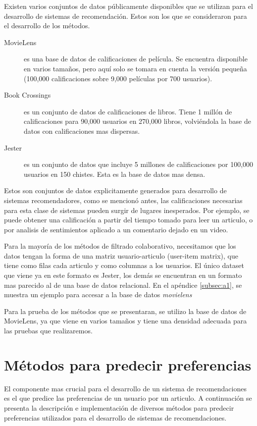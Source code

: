\documentclass[11pt]{article}
\begin{document}
Existen varios conjuntos de datos públicamente disponibles que se utilizan para
el desarrollo de sistemas de recomendación. Estos son los que se consideraron
para el desarrollo de los métodos.

\begin{description}
\item [MovieLens \cite{movielens}] es una base de datos de calificaciones de
  película. Se encuentra disponible en varios tamaños, pero aquí solo se tomara
  en cuenta la versión pequeña (100,000 calificaciones sobre 9,000 películas por
  700 usuarios).
\item [Book Crossings \cite{bookcrossing}] es un conjunto de datos de
  calificaciones de libros. Tiene 1 millón de calificaciones para 90,000
  usuarios en 270,000 libros, volviéndola la base de datos con calificaciones
  mas dispersas.
\item [Jester \cite{eigentaste}] es un conjunto de datos que incluye 5 millones
  de calificaciones por 100,000 usuarios en 150 chistes. Esta es la base de
  datos mas densa.
\end{description}

Estos son conjuntos de datos explicitamente generados para desarrollo de
sistemas recomendadores, como se mencionó antes, las calificaciones necesarias
para esta clase de sistemas pueden surgir de lugares inesperados. Por ejemplo,
se puede obtener una calificación a partir del tiempo tomado para leer un
articulo, o por analisis de sentimientos aplicado a un comentario dejado en un
video.

Para la mayoría de los métodos de filtrado colaborativo, necesitamos que los
datos tengan la forma de una matriz usuario-articulo (user-item matrix), que
tiene como filas cada articulo y como columnas a los usuarios. El único dataset
que viene ya en este formato es Jester, los demás se encuentran en un formato
mas parecido al de una base de datos relacional. En el apéndice \ref{subsec:a1},
se muestra un ejemplo para accesar a la base de datos \emph{movielens}

Para la prueba de los métodos que se presentaran, se utilizo la base de datos de
MovieLens, ya que viene en varios tamaños y tiene una densidad adecuada para las
pruebas que realizaremos.

\section{Métodos para predecir preferencias}

El componente mas crucial para el desarrollo de un sistema de recomendaciones es
el que predice las preferencias de un usuario por un articulo. A continuación se
presenta la descripción e implementación de diversos métodos para predecir
preferencias utilizados para el desarrollo de sistemas de recomendaciones.
\end{document}
